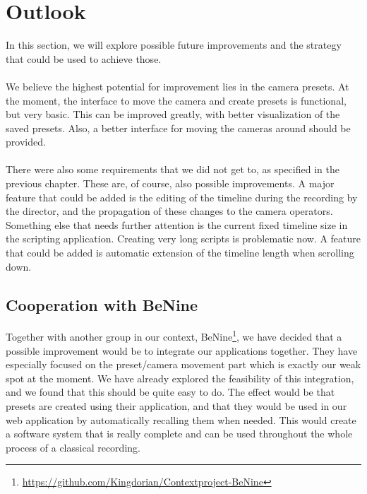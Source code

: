 \section{Outlook}

In this section, we will explore possible future improvements and the strategy that could be used to achieve those.\\\\
We believe the highest potential for improvement lies in the camera presets. At the moment, the interface to move the camera and create presets is functional, but very basic. This can be improved greatly, with better visualization of the saved presets. Also, a better interface for moving the cameras around should be provided.\\\\
There were also some requirements that we did not get to, as specified in the previous chapter. These are, of course, also possible improvements. A major feature that could be added is the editing of the timeline during the recording by the director, and the propagation of these changes to the camera operators.\\
Something else that needs further attention is the current fixed timeline size in the scripting application. Creating very long scripts is problematic now. A feature that could be added is automatic extension of the timeline length when scrolling down.

\subsection{Cooperation with BeNine}
Together with another group in our context, BeNine\footnote{\url{https://github.com/Kingdorian/Contextproject-BeNine}}, we have decided that a possible improvement would be to integrate our applications together. They have especially focused on the preset/camera movement part which is exactly our weak spot at the moment. We have already explored the feasibility of this integration, and we found that this should be quite easy to do. The effect would be that presets are created using their application, and that they would be used in our web application by automatically recalling them when needed. This would create a software system that is really complete and can be used throughout the whole process of a classical recording.


